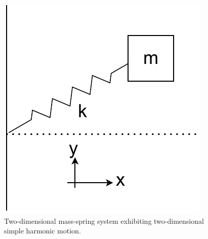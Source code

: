 \documentclass{statsmsc}
\begin{document}
\begin{figure}[H]
        \centering
        \includegraphics[width=0.4\linewidth]{../figures/2dshm.pdf}
        \caption{Two-dimensional mass-spring system exhibiting two-dimensional simple harmonic motion.}
        \label{fig:shm_2d_diagram}
\end{figure}
\end{document}
